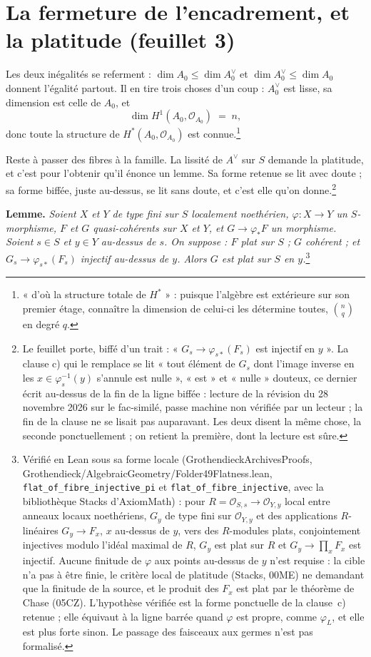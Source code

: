 \documentclass[11pt,a4paper]{article}
\begin{document}
\section*{La fermeture de l'encadrement, et la platitude (feuillet 3)}

Les deux inégalités se referment : $\dim A_{0} \leqslant \dim A^{\vee}_{0}$ et
$\dim A^{\vee}_{0} \leqslant \dim A_{0}$ donnent l'égalité partout. Il en tire
trois choses d'un coup : $A^{\vee}_{0}$ est lisse, sa dimension est celle de
$A_{0}$, et
\[
  \dim H^{1}(A_{0}, \mathcal{O}_{A_{0}}) \;=\; n,
\]
donc toute la structure de $H^{*}(A_{0}, \mathcal{O}_{A_{0}})$ est
connue.\footnote{« d'où la structure totale de $H^{*}$ » : puisque
l'algèbre est extérieure sur son premier étage, connaître la dimension de
celui-ci les détermine toutes, $\binom{n}{q}$ en degré $q$.}

Reste à passer des fibres à la famille. La lissité de $A^{\vee}$ sur $S$
demande la platitude, et c'est pour l'obtenir qu'il énonce un lemme. Sa forme
retenue se lit avec doute ; sa forme biffée, juste au-dessus, se lit sans
doute, et c'est elle qu'on donne.\footnote{Le feuillet porte, biffé d'un trait :
« $G_{s} \to \varphi_{s*}(F_{s})$ est injectif en $y$ ». La clause c) qui le
remplace se lit « tout élément de $G_{s}$ dont l'image inverse en les
$x \in \varphi_{s}^{-1}(y)$ s'annule est nulle », « est » et « nulle »
douteux, ce dernier écrit au-dessus de la fin de la ligne biffée : lecture de
la révision du 28 novembre 2026 sur le fac-similé, passe machine non vérifiée
par un lecteur ; la fin de la clause ne se lisait pas auparavant. Les deux disent la
même chose, la seconde ponctuellement ; on retient la première, dont la lecture
est sûre.}

\textbf{Lemme.} \emph{Soient $X$ et $Y$ de type fini sur $S$ localement
noethérien, $\varphi : X \to Y$ un $S$-morphisme, $F$ et $G$ quasi-cohérents
sur $X$ et $Y$, et $G \to \varphi_{*}F$ un morphisme. Soient $s \in S$ et
$y \in Y$ au-dessus de $s$. On suppose : $F$ plat sur $S$ ; $G$ cohérent ; et
$G_{s} \to \varphi_{s*}(F_{s})$ injectif au-dessus de $y$. Alors $G$ est plat
sur $S$ en $y$.}\footnote{Vérifié en Lean sous sa forme locale
(GrothendieckArchivesProofs, Grothendieck/AlgebraicGeometry/Folder49Flatness.lean,
\texttt{flat\_of\_fibre\_injective\_pi} et
\texttt{flat\_of\_fibre\_injective}, avec la bibliothèque Stacks
d'AxiomMath) : pour $R = \mathcal{O}_{S,s} \to \mathcal{O}_{Y,y}$ local entre
anneaux locaux noethériens, $G_{y}$ de type fini sur $\mathcal{O}_{Y,y}$ et des
applications $R$-linéaires $G_{y} \to F_{x}$, $x$ au-dessus de $y$, vers des
$R$-modules plats, conjointement injectives modulo l'idéal maximal de $R$,
$G_{y}$ est plat sur $R$ et $G_{y} \to \prod_{x} F_{x}$ est injectif. Aucune
finitude de $\varphi$ aux points au-dessus de $y$ n'est requise : la cible n'a
pas à être finie, le critère local de platitude (Stacks, 00ME) ne demandant que
la finitude de la source, et le produit des $F_{x}$ est plat par le théorème de
Chase (05CZ). L'hypothèse vérifiée est la forme ponctuelle de la clause~c)
retenue ; elle équivaut à la ligne barrée quand $\varphi$ est propre, comme
$\varphi_{L}$, et elle est plus forte sinon. Le passage des faisceaux aux
germes n'est pas formalisé.}
\end{document}
